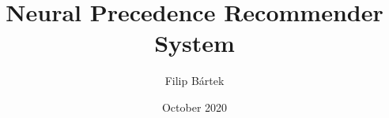 \usepackage{amsmath}
\usepackage{cleveref}
\usepackage{todonotes}

\usepackage[numbers]{natbib}


\newcommand{\mli}[1]{\mathit{#1}}

\DeclareMathOperator{\re}{\mathbb{R}}
\DeclareMathOperator{\sigmoid}{sigmoid}
\newcommand{\inv}[1]{#1^{-1}}

\DeclareMathOperator{\symbols}{\Sigma}
\newcommand{\fv}{\mli{fv}}

\DeclareMathOperator{\Cost}{\mli{c}}
\DeclareMathOperator{\CostSym}{\mli{\Cost_{sym}}}
\DeclareMathOperator{\CostPrec}{\mli{\Cost_{prec}}}
\DeclareMathOperator{\CostPrecPair}{\mli{\Cost_{pair}}}

\newcommand{\definiendum}[1]{#1}
\newcommand{\vampire}{Vampire}
\newcommand{\frequency}{\texttt{frequency}}
\newcommand{\atping}{automated theorem proving}

\usepackage{glossaries}

\title{Neural Precedence Recommender System}
\author{Filip Bártek}
\date{October 2020}
